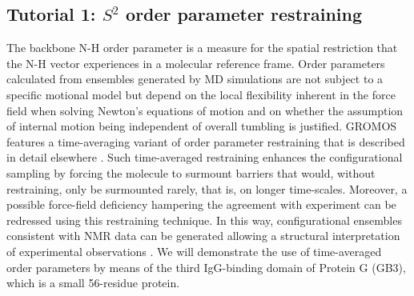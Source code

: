 
\subsection{Tutorial 1: $S^2$ order parameter restraining}
The backbone N-H order parameter is a measure for the spatial restriction that the N-H vector experiences in a molecular reference frame. 
Order parameters calculated from ensembles generated by MD simulations are not subject to a specific motional model but depend on the 
local flexibility inherent in the force field when solving Newton's equations of motion and on whether the assumption of internal motion 
being independent of overall tumbling is justified. 
GROMOS features a time-averaging variant of order parameter restraining that is described in detail elsewhere \cite{Hansen_S2_2014}. 
Such time-averaged restraining enhances the configurational sampling by forcing the molecule to surmount barriers that would, without restraining, only be surmounted rarely, 
that is, on longer time-scales. Moreover, a possible force-field deficiency hampering the agreement with experiment can be redressed using this restraining technique. 
In this way, configurational ensembles consistent with NMR data can be generated allowing a structural interpretation of experimental observations \cite{Smith_2017,Smith_2021}.
We will demonstrate the use of time-averaged order parameters by means of the third IgG-binding domain of Protein G (GB3), which is a small 56-residue protein.

